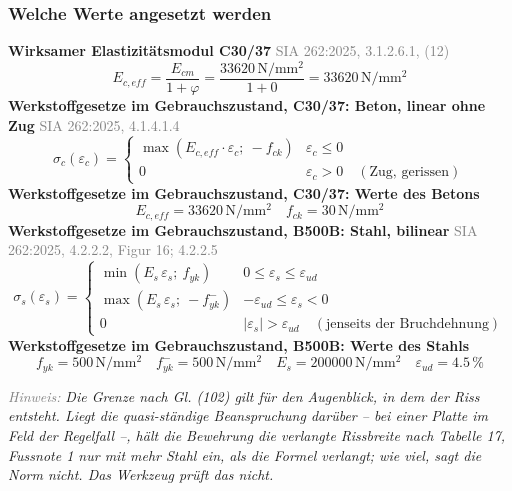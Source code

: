 \documentclass[11pt,a4paper]{article}
\newcommand{\normref}[1]{{\small\textcolor{gray}{#1}}}
\newcommand{\hinweis}[2]{\par\noindent\textcolor{gray}{\textit{#1:}} \textit{#2}\par}
\begin{document}
\subsubsection{Welche Werte angesetzt werden}
\noindent\textbf{Wirksamer Elastizitätsmodul C30/37} \hfill \normref{SIA 262:2025, 3.1.2.6.1, (12)}
\begin{equation*}
E_{c,eff} = \frac{E_{cm}}{1 + \varphi} = \frac{33620\,\mathrm{N}/\mathrm{mm}^{2}}{1 + 0} = 33620\,\mathrm{N}/\mathrm{mm}^{2}
\end{equation*}
\noindent\textbf{Werkstoffgesetze im Gebrauchszustand, C30/37: Beton, linear ohne Zug} \hfill \normref{SIA 262:2025, 4.1.4.1.4}
\begin{equation*}
\sigma_c(\varepsilon_c) = \begin{cases} \max\left(E_{c,eff} \cdot \varepsilon_c;\ -f_{ck}\right) & \varepsilon_c \le 0 \\[1ex] 0 & \varepsilon_c > 0 \quad (\text{Zug, gerissen}) \end{cases}
\end{equation*}
\noindent\textbf{Werkstoffgesetze im Gebrauchszustand, C30/37: Werte des Betons}
\begin{equation*}
E_{c,eff} = 33620\,\mathrm{N}/\mathrm{mm}^{2} \quad f_{ck} = 30\,\mathrm{N}/\mathrm{mm}^{2}
\end{equation*}
\noindent\textbf{Werkstoffgesetze im Gebrauchszustand, B500B: Stahl, bilinear} \hfill \normref{SIA 262:2025, 4.2.2.2, Figur 16; 4.2.2.5}
\begin{equation*}
\sigma_s(\varepsilon_s) = \begin{cases} \min(E_s\,\varepsilon_s;\ f_{yk}) & 0 \le \varepsilon_s \le \varepsilon_{ud} \\[1ex] \max(E_s\,\varepsilon_s;\ -f_{yk}^{-}) & -\varepsilon_{ud} \le \varepsilon_s < 0 \\[1ex] 0 & |\varepsilon_s| > \varepsilon_{ud} \quad (\text{jenseits der Bruchdehnung}) \end{cases}
\end{equation*}
\noindent\textbf{Werkstoffgesetze im Gebrauchszustand, B500B: Werte des Stahls}
\begin{equation*}
f_{yk} = 500\,\mathrm{N}/\mathrm{mm}^{2} \quad f_{yk}^{-} = 500\,\mathrm{N}/\mathrm{mm}^{2} \quad E_s = 200000\,\mathrm{N}/\mathrm{mm}^{2} \quad \varepsilon_{ud} = 4.5\,\%
\end{equation*}
\hinweis{Hinweis}{Die Grenze nach Gl. (102) gilt für den Augenblick, in dem der Riss entsteht. Liegt die quasi-ständige Beanspruchung darüber – bei einer Platte im Feld der Regelfall –, hält die Bewehrung die verlangte Rissbreite nach Tabelle 17, Fussnote 1 nur mit mehr Stahl ein, als die Formel verlangt; wie viel, sagt die Norm nicht. Das Werkzeug prüft das nicht.}
\end{document}
